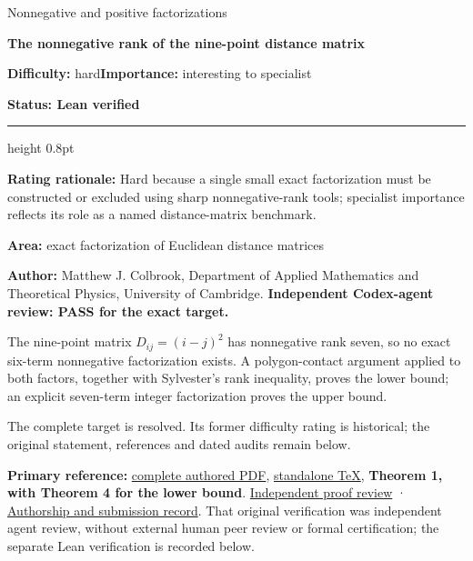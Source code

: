 \documentclass[11pt,a4paper]{article}
\makeatletter
\renewcommand{\subsection}{\Needspace{4\baselineskip}\@startsection{subsection}{2}{0pt}{9pt plus 1pt minus 1pt}{3pt}{\sffamily\bfseries\normalsize\color{ink}}}
\makeatother
\begin{document}
{\sffamily\small\color{muted}Nonnegative and positive
factorizations\par}
\vspace{3pt}
{\raggedright{}\sffamily\bfseries\fontsize{21}{24}\selectfont\color{ink}The
nonnegative rank of the nine-point distance matrix\par}
\vspace{7pt}
{\sffamily\small\textbf{Difficulty:} hard\quad\textbf{Importance:} interesting
to specialist\par}
{\sffamily\small\bfseries\color{accent}Status: Lean verified\par}
\vspace{4pt}
{\color{accent}\hrule height 0.8pt}
\vspace{6pt}
\textbf{Rating rationale:} Hard because a single small exact
factorization must be constructed or excluded using sharp
nonnegative-rank tools; specialist importance reflects its role as a
named distance-matrix benchmark.

\textbf{Area:} exact factorization of Euclidean distance matrices

\subsection{Resolution --- 2026-09-11}\label{resolution-2026-09-11}

\textbf{Author:} Matthew J. Colbrook, Department of Applied Mathematics
and Theoretical Physics, University of Cambridge. \textbf{Independent
Codex-agent review: PASS for the exact target.}

The nine-point matrix \(D_{ij}=(i-j)^2\) has nonnegative rank seven, so
no exact six-term nonnegative factorization exists. A polygon-contact
argument applied to both factors, together with Sylvester's rank
inequality, proves the lower bound; an explicit seven-term integer
factorization proves the upper bound.

The complete target is resolved. Its former difficulty rating is
historical; the original statement, references and dated audits remain
below.

\textbf{Primary reference:}
\href{https://github.com/ajt60gaibb/OpenProblemsInNLA/blob/main/references/colbrook-factorization-2026-09-11/manuscripts/NR-04_nine_point_distance.pdf}{complete
authored PDF},
\href{https://github.com/ajt60gaibb/OpenProblemsInNLA/blob/main/references/colbrook-factorization-2026-09-11/manuscripts/NR-04_nine_point_distance.tex}{standalone
TeX}, \textbf{Theorem 1, with Theorem 4 for the lower bound}.
\href{https://github.com/ajt60gaibb/OpenProblemsInNLA/blob/main/references/colbrook-factorization-2026-09-11/verification/reviews/NR-04-review.md}{Independent
proof review} ·
\href{https://github.com/ajt60gaibb/OpenProblemsInNLA/blob/main/references/colbrook-factorization-2026-09-11/README.md}{Authorship
and submission record}. That original verification was independent agent
review, without external human peer review or formal certification; the
separate Lean verification is recorded below.
\end{document}
